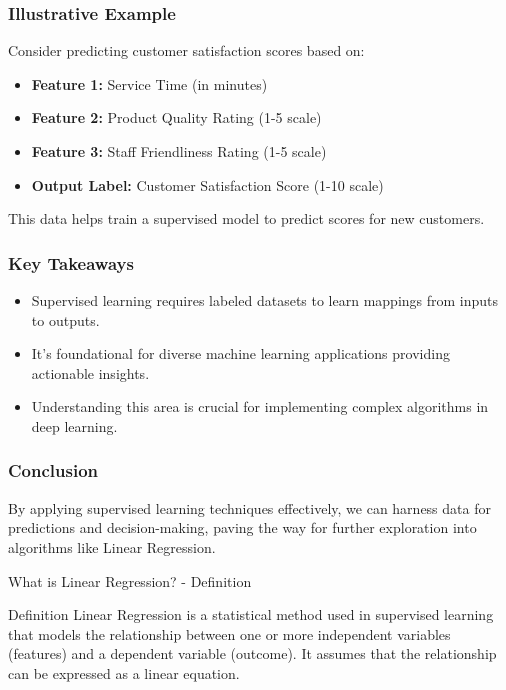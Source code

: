 \documentclass[aspectratio=169]{beamer}
\begin{document}
\begin{frame}[fragile]
    \frametitle{Illustrative Example}
    Consider predicting customer satisfaction scores based on:
    \begin{itemize}
        \item \textbf{Feature 1:} Service Time (in minutes)
        \item \textbf{Feature 2:} Product Quality Rating (1-5 scale)
        \item \textbf{Feature 3:} Staff Friendliness Rating (1-5 scale)
        \item \textbf{Output Label:} Customer Satisfaction Score (1-10 scale)
    \end{itemize}
    This data helps train a supervised model to predict scores for new customers.
\end{frame}

\begin{frame}[fragile]
    \frametitle{Key Takeaways}
    \begin{itemize}
        \item Supervised learning requires labeled datasets to learn mappings from inputs to outputs.
        \item It's foundational for diverse machine learning applications providing actionable insights.
        \item Understanding this area is crucial for implementing complex algorithms in deep learning.
    \end{itemize}
\end{frame}

\begin{frame}[fragile]
    \frametitle{Conclusion}
    By applying supervised learning techniques effectively, we can harness data for predictions and decision-making, paving the way for further exploration into algorithms like Linear Regression.
\end{frame}

\begin{frame}[fragile]{What is Linear Regression? - Definition}
    \begin{block}{Definition}
        Linear Regression is a statistical method used in supervised learning that models the relationship between one or more independent variables (features) and a dependent variable (outcome). It assumes that the relationship can be expressed as a linear equation.
    \end{block}
\end{frame}
\end{document}
